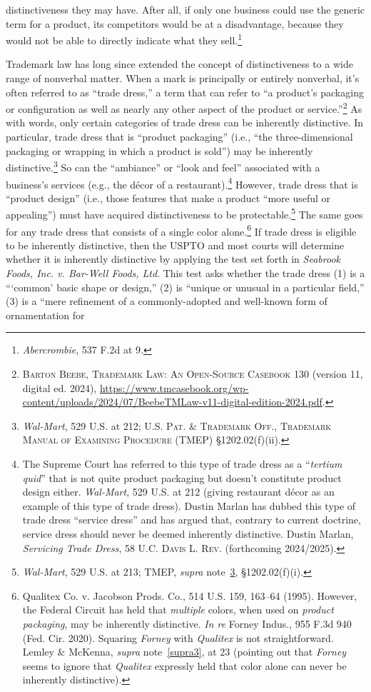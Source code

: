 \documentclass[letterpaper, 11pt, oneside]{article}
\begin{document}
distinctiveness they may have. After all, if only one business could use the generic term for a product, its competitors would be at a disadvantage, because they would not be able to directly indicate what they sell.\footnote{\textit{Abercrombie}, 537 F.2d at 9.}

Trademark law has long since extended the concept of distinctiveness to a wide range of nonverbal matter. When a mark is principally or entirely nonverbal, it's often referred to as ``trade dress,'' a term that can refer to ``a product’s packaging or configuration as well as nearly any other aspect of the product or service.''\footnote{\textsc{Barton Beebe, Trademark Law: An Open-Source Casebook} 130 (version 11, digital ed. 2024), \url{https://www.tmcasebook.org/wp-content/uploads/2024/07/BeebeTMLaw-v11-digital-edition-2024.pdf}.} As with words, only certain categories of trade dress can be inherently distinctive. In particular, trade dress that is ``product packaging'' (i.e., ``the three-dimensional packaging or wrapping in which a product is sold'') may be inherently distinctive.\footnote{\label{supra12} \textit{Wal-Mart}, 529 U.S. at 212; \textsc{U.S. Pat. \& Trademark Off., Trademark Manual of Examining Procedure} (TMEP) \S 1202.02(f)(ii).} So can the ``ambiance'' or ``look and feel'' associated with a business's services (e.g., the décor of a restaurant).\footnote{The Supreme Court has referred to this type of trade dress as a ``\textit{tertium quid}'' that is not quite product packaging but doesn't constitute product design either. \textit{Wal-Mart}, 529 U.S. at 212 (giving restaurant décor as an example of this type of trade dress). Dustin Marlan has dubbed this type of trade dress ``service dress'' and has argued that, contrary to current doctrine, service dress should never be deemed inherently distinctive. Dustin Marlan, \textit{Servicing Trade Dress}, 58 \textsc{U.C. Davis L. Rev.} (forthcoming 2024/2025).} However, trade dress that is ``product design'' (i.e., those features that make a product ``more useful or appealing'') must have acquired distinctiveness to be protectable.\footnote{\textit{Wal-Mart}, 529 U.S. at 213; TMEP, \textit{supra} note~\ref{supra12}, \S 1202.02(f)(i).} The same goes for any trade dress that consists of a single color alone.\footnote{Qualitex Co. v. Jacobson Prods. Co., 514 U.S. 159, 163–64 (1995). However, the Federal Circuit has held that \textit{multiple} colors, when used on \textit{product packaging}, may be inherently distinctive. \textit{In re} Forney Indus., 955 F.3d 940 (Fed. Cir. 2020). Squaring \textit{Forney} with \textit{Qualitex} is not straightforward. Lemley \& McKenna, \textit{supra} note~\ref{supra3}, at 23 (pointing out that \textit{Forney} seems to ignore that \textit{Qualitex} expressly held that color alone can never be inherently distinctive).} If trade dress is eligible to be inherently distinctive, then the USPTO and most courts will determine whether it is inherently distinctive by applying the test set forth in \textit{Seabrook Foods, Inc. v. Bar-Well Foods, Ltd}. This test asks whether the trade dress (1) is a ```common' basic shape or design,'' (2) is ``unique or unusual in a particular field,'' (3) is a ``mere refinement of a commonly-adopted and well-known form of ornamentation for 
\end{document}
